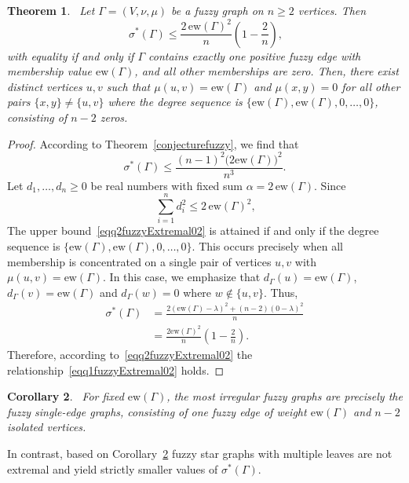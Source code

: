 \documentclass[12pt]{amsart}
\newtheorem{theorem}{Theorem}[section]
\newtheorem{corollary}[theorem]{Corollary}
\newcommand{\ew}{\mathrm{ew}}
\newcommand{\SF}{\sigma^*}
\newcommand{\SFG}{\sigma^*(\Gamma)}
\begin{document}
\begin{theorem}~\label{fuzzyExtremal02}
Let $\Gamma=(V, \nu,\mu)$ be a fuzzy graph on $n \geqslant 2$ vertices. Then
\begin{equation}~\label{eqq1fuzzyExtremal02}
\SFG\leqslant \frac{2\,\ew(\Gamma)^2}{n} \left(1-\frac{2}{n}\right),
\end{equation}
with equality if and only if $\Gamma$ contains exactly one positive fuzzy edge  with membership value $\ew(\Gamma)$, and all other memberships are zero.
Then, there exist distinct vertices $u, v$ such that $\mu(u, v) = \ew(\Gamma)$ and $ \mu(x, y) = 0$ for all other pairs $\{x, y\} \neq \{u, v\}$ where  the degree sequence is $\{\ew(\Gamma), \ew(\Gamma), 0, \dots, 0\}$, consisting of $n-2$ zeros.
\end{theorem}
\begin{proof}
According to Theorem~\ref{conjecturefuzzy}, we find that 
\[
\SF(\Gamma) \leqslant \dfrac{(n-1)^2 \Big(2\ew(\Gamma)\Big)^2}{n^3}.
\]
Let $d_1, \dots, d_n \geq 0$ be real numbers with fixed sum $\alpha=2\,\ew(\Gamma)$. Since 
\begin{equation}~\label{eqq2fuzzyExtremal02}
\sum_{i=1}^n d_i^2 \leq 2\,\ew(\Gamma)^2, 
\end{equation}
The upper bound~\eqref{eqq2fuzzyExtremal02} is attained if and only if the degree sequence is $\{\ew(\Gamma), \ew(\Gamma), 0, \dots, 0\}$. This occurs precisely when all membership is concentrated on a single pair of vertices $u, v$ with $\mu(u, v)= \ew(\Gamma)$. In this case, we emphasize that $d_\Gamma(u)=\ew(\Gamma)$, $d_\Gamma(v)=\ew(\Gamma)$ and $d_\Gamma(w)=0$ where $w \notin \{u, v\}.$ Thus, 
\begin{align*}
\SFG &=\frac{2(\ew(\Gamma)-\lambda)^2+(n-2)(0-\lambda)^2}{n}\\
&=\frac{2\ew(\Gamma)^2}{n}\left(1-\frac{2}{n}\right).
\end{align*}
Therefore, according to~\eqref{eqq2fuzzyExtremal02} the relationship~\eqref{eqq1fuzzyExtremal02} holds.
\end{proof}

\begin{corollary}~\label{fuzzycorollary03}
For fixed $\ew(\Gamma)$, the most irregular fuzzy graphs are precisely the fuzzy single-edge graphs, consisting of one fuzzy edge of weight $\ew(\Gamma)$ and $n-2$ isolated vertices. 
\end{corollary}
In contrast, based on Corollary~\ref{fuzzycorollary03} fuzzy star graphs with multiple leaves are not extremal and yield strictly smaller values of $\SFG$.
\end{document}
